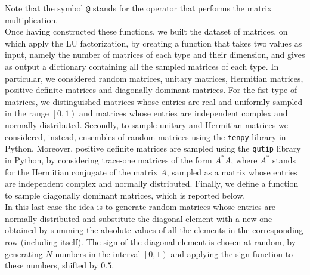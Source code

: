 \documentclass[a4paper,11pt]{report}
\begin{document}
\noindent Note that the symbol \texttt{@} stands for the operator that performs the matrix multiplication.\\

\noindent Once having constructed these functions, we built the dataset of matrices, on which apply the LU factorization, by creating a function that takes two values as input, namely the number of matrices of each type and their dimension, and gives as output a dictionary containing all the sampled matrices of each type. In particular, we considered random matrices, unitary matrices, Hermitian matrices, positive definite matrices and diagonally dominant matrices. For the fist type of matrices, we distinguished matrices whose entries are real and uniformly sampled in the range $\left[0,1\right)$ and matrices whose entries are independent complex and normally distributed. Secondly, to sample unitary and Hermitian matrices we considered, instead, ensembles of random matrices using the \texttt{tenpy} library in Python. Moreover, positive definite matrices are sampled using the \texttt{qutip} library in Python, by considering trace-one matrices of the form $A^{*}A$, where $A^{*}$ stands for the Hermitian conjugate of the matrix $A$, sampled as a matrix whose entries are independent complex and normally distributed. Finally, we define a function to sample diagonally dominant matrices, which is reported below.\\

\noindent In this last case the idea is to generate random matrices whose entries are normally distributed and substitute the diagonal element with a new one obtained by summing the absolute values of all the elements in the corresponding row (including itself). The sign of the diagonal element is chosen at random, by generating $N$ numbers in the interval $\left[0,1\right)$ and applying the sign function to these numbers, shifted by $0.5$.
\end{document}
